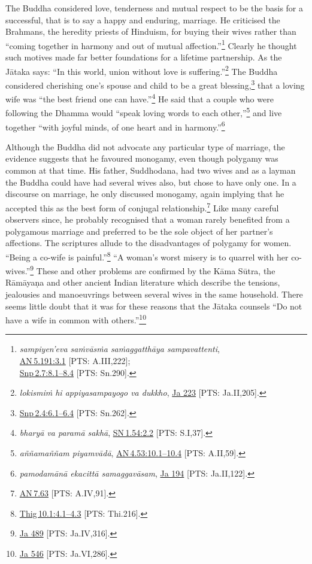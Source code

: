 \documentclass[10pt, openright]{book}
\begin{document}
The Buddha considered love, tenderness and mutual respect to be the basis for a successful, that is to say a happy and enduring, marriage. He criticised the Brahmans, the heredity priests of Hinduism, for buying their wives rather than “coming together in harmony and out of mutual affection.”\footnote {\textit{sampiyen’eva saṁvāsṁa saṁaggatthāya sampavattenti},\\
\href{https://suttacentral.net/an5.191/en/sujato\#3.1}{AN 5.191:3.1} [PTS: A.III,222];\\
\href{https://suttacentral.net/snp2.7/en/sujato\#8.1}{Snp 2.7:8.1–8.4} [PTS: Sn.290].} Clearly he thought such motives made far better foundations for a lifetime partnership. As the Jātaka says: “In this world, union without love is suffering.”\footnote {\textit{lokismiṁ hi appiyasampayogo va dukkho}, \href{https://suttacentral.net/ja223/en/rouse?reference=main/pts#pts-vp-pli205}{Ja 223} [PTS: Ja.II,205].} The Buddha considered cherishing one’s spouse and child to be a great blessing,\footnote {\href{https://suttacentral.net/snp2.4/en/sujato\#6.1}{Snp 2.4:6.1–6.4} [PTS: Sn.262].} that a loving wife was “the best friend one can have.”\footnote {\textit{bharyā va paramā sakhā}, \href{https://suttacentral.net/sn1.54/en/sujato\#2.2}{SN 1.54:2.2} [PTS: S.I,37].} He said that a couple who were following the Dhamma would “speak loving words to each other,”\footnote {\textit{aññamaññam piyamvādā}, \href{https://suttacentral.net/an4.53/en/sujato\#10.1}{AN 4.53:10.1–10.4} [PTS: A.II,59].} and live together “with joyful minds, of one heart and in harmony.”\footnote {\textit{pamodamānā ekacittā samaggavāsam}, \href{https://suttacentral.net/ja194/en/rouse?reference=main/pts#pts-vp-pli122}{Ja 194} [PTS: Ja.II,122].}


Although the Buddha did not advocate any particular type of marriage, the evidence suggests that he favoured monogamy, even though polygamy was common at that time. His father, Suddhodana, had two wives and as a layman the Buddha could have had several wives also, but chose to have only one. In a discourse on marriage, he only discussed monogamy, again implying that he accepted this as the best form of conjugal relationship.\footnote {\href{https://suttacentral.net/an7.63/en/sujato}{AN 7.63} [PTS: A.IV,91].} Like many careful observers since, he probably recognised that a woman rarely benefited from a polygamous marriage and preferred to be the sole object of her partner’s affections. The scriptures allude to the disadvantages of polygamy for women. “Being a co-wife is painful.”\footnote {\href{https://suttacentral.net/thig10.1/en/sujato\#4.1}{Thig 10.1:4.1–4.3} [PTS: Thi.216].} “A woman’s worst misery is to quarrel with her co-wives.”\footnote {\href{https://suttacentral.net/ja489/en/rouse?reference=main/pts#pts-vp-pli316}{Ja 489} [PTS: Ja.IV,316].} These and other problems are confirmed by the Kāma Sūtra, the Rāmāyaṇa and other ancient Indian literature which describe the tensions, jealousies and manoeuvrings between several wives in the same household. There seems little doubt that it was for these reasons that the Jātaka counsels “Do not have a wife in common with others.”\footnote {\href{https://suttacentral.net/ja546/en/cowell-rouse?reference=main/pts#pts-vp-pli286}{Ja 546} [PTS: Ja.VI,286].}
\end{document}
